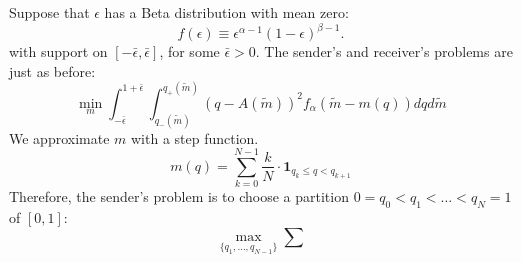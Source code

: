 \documentclass[12pt]{article}
\begin{document}
\onehalfspacing
Suppose that $\epsilon$ has a Beta distribution with mean zero:
\begin{equation}
f(\epsilon)\equiv\epsilon^{\alpha-1}(1-\epsilon)^{\beta-1}. 
\end{equation}
with support on $[-\bar{\epsilon},\bar{\epsilon}]$, for some $\bar{\epsilon}>0$. The sender's and receiver's problems are just as before:
\begin{equation}
\min_{m}\int_{-\bar{\epsilon}}^{1+\bar{\epsilon}}{\int_{q_{-}(\tilde{m})}^{q_{+}(\tilde{m})}{(q-A(\tilde{m}))^{2}f_{\alpha}(\tilde{m}-m(q))dq}d\tilde{m}}
\end{equation}
We approximate $m$ with a step function. 
\begin{equation}
m(q)=\sum_{k=0}^{N-1}{\frac{k}{N}\cdot\mathbf{1}_{q_{k}\leq q<q_{k+1}}}
\end{equation}
Therefore, the sender's problem is to choose a partition $0=q_{0}<q_{1}<\ldots<q_{N}=1$ of $[0,1]$:
\begin{equation}
\max_{\{q_{1},\ldots,q_{N-1}\}}\sum_{}
\end{equation}
\end{document}
